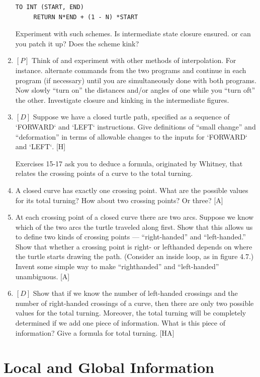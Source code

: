 \documentclass{book}
\begin{document}
\begin{enumerate}
\begin{verbatim}     
TO INT (START, END)
     RETURN N*END + (1 - N) *START
\end{verbatim}
Experiment with such schemes. Is intermediate state closure ensured.
or can you patch it up? Does the scheme kink?

\item $[P]$ Think of and experiment with other methods of interpolation.
For instance. alternate commands from the two programs and continue in each program (if necessary) until you are simultaneously done
with both programs. Now slowly ``turn on'' the distances and/or angles
of one while you ``turn oft'' the other. Investigate closure and kinking in
the intermediate figures.
\item $[D]$ Suppose we have a closed turtle path, specified as a sequence of
\textsc{`FORWARD`} and \textsc{`LEFT`} instructions. Give definitions of ``small change'' and
``deformation'' in terms of allowable changes to the inputs for \textsc{`FORWARD`}
and \textsc{`LEFT`}. [H]

Exercises 15-17 ask you to deduce a formula, originated by Whitney,
that relates the crossing points of a curve to the total turning.

\item A closed curve has exactly one crossing point. What are the possible
values for its total turning? How about two crossing points? Or three?
[A]

\item At each crossing point of a closed curve there are two arcs. Suppose
we know which of the two arcs the turtle traveled along first. Show that
this allows us to define two kinds of crossing points --- ``right-handed''
and ``left-handed.'' Show that whether a crossing point is right- or lefthanded depends on where the turtle starts drawing the path. (Consider
an inside loop, as in figure 4.7.) Invent some simple way to make ``righthanded'' and ``left-handed'' unambiguous. [A]

\item $[D]$ Show that if we know the number of left-handed crossings and
the number of right-handed crossings of a curve, then there are only two
possible values for the total turning. Moreover, the total turning will be
completely determined if we add one piece of information. What is this
piece of information? Give a formula for total turning. [HA]
\end{enumerate}

\section{Local and Global Information}
\end{document}
